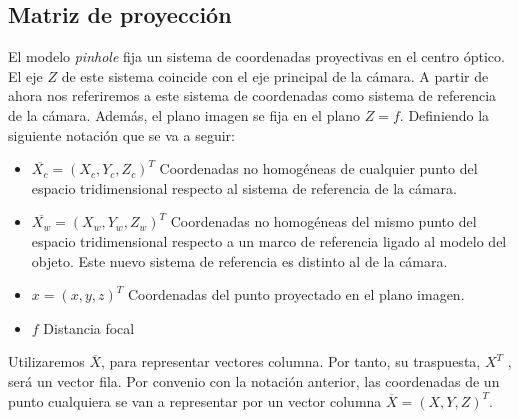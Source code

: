 \subsection{Matriz de proyección}
El modelo \emph{pinhole} fija un sistema de coordenadas proyectivas en el centro óptico. El eje $Z$ de este sistema coincide con el eje principal de la cámara. A partir de ahora nos referiremos a este sistema de coordenadas como sistema de referencia de la cámara. Además, el plano imagen se fija en el plano $Z = f$.
Definiendo la siguiente notación que se va a seguir:
\begin{itemize}
\item $\overline{X_c} = (X_c , Y_c , Z_c )^T$ Coordenadas no homogéneas de cualquier punto del espacio tridimensional respecto al sistema de referencia de la cámara.
\item $\overline{X_w} = (X_w , Y_w , Z_w )^T$ Coordenadas no homogéneas del mismo punto del espacio tridimensional respecto a un marco de referencia ligado al modelo del objeto. Este nuevo sistema de referencia es distinto al de la cámara.
\item $x = (x, y, z)^T$  Coordenadas del punto proyectado en el plano imagen.
\item $f$  Distancia focal
\end{itemize}

Utilizaremos $\overline{X}$, para representar vectores columna. Por tanto, su traspuesta, $X^T$ , será un vector fila. Por convenio con la notación anterior, las coordenadas de un punto cualquiera se van a representar por un vector columna $\overline{X} = (X, Y, Z)^T$.

